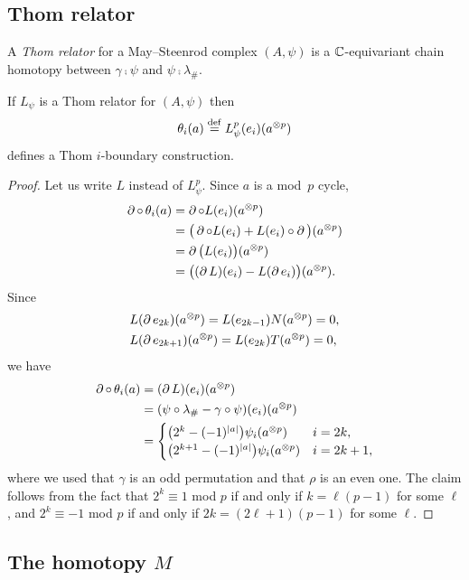 \subsection{Thom relator}

A \textit{Thom relator} for a May--Steenrod complex $(A, \psi)$ is a $\mathbb{C}$-equivariant chain homotopy between $\gamma \comp \psi$ and $\psi \comp \lambda_\#$.

\begin{theorem*}
	If $L_\psi$ is a Thom relator for $(A, \psi)$ then
	\[
	\theta_i(a) \stackrel{\mathrm{def}}{=} L_\psi^p(e_i)(a^{\otimes p})
	\]
	defines a Thom $i$-boundary construction.
\end{theorem*}

\begin{proof}
	Let us write $L$ instead of $L_\psi^p$.
	Since $a$ is a mod~$p$ cycle,
	\begin{align*}
		\operatorname{\partial} \mathbin{\circ}\, \theta_i(a) & =
		\operatorname{\partial} \mathbin{\circ} L(e_i)(a^{\otimes p}) \\ & =
		\big(\operatorname{\partial} \mathbin{\circ} L(e_i) + L(e_i) \mathbin{\circ} \operatorname{\partial} \big) (a^{\otimes p}) \\ & =
		\operatorname{\partial} \big(L(e_i)\big)(a^{\otimes p}) \\ & =
		\big((\operatorname{\partial} L)(e_i) - L(\operatorname{\partial} e_i)\big)(a^{\otimes p}).
	\end{align*}
	Since
	\begin{align*}
		&L(\operatorname{\partial} e_{2k})(a^{\otimes p}) = L(e_{2k-1}) N(a^{\otimes p}) = 0, \\
		&L(\operatorname{\partial} e_{2k+1})(a^{\otimes p}) = L(e_{2k}) T(a^{\otimes p}) = 0,
	\end{align*}
	we have
	\begin{align*}
		\operatorname{\partial} \mathbin{\circ}\, \theta_i(a) & =
		(\operatorname{\partial} L)(e_i)(a^{\otimes p}) \\ & =
		(\psi \mathbin{\circ} \lambda_\# - \gamma \mathbin{\circ} \psi)(e_i)(a^{\otimes p}) \\ & =
		\begin{cases}
			\big(2^k - (-1)^{\lvert a\rvert}\big) \psi_i(a^{\otimes p}) & i=2k, \\
			\big(2^{k+1} - (-1)^{\lvert a\rvert}\big) \psi_i(a^{\otimes p}) & i=2k+1,
		\end{cases}
	\end{align*}
	where we used that $\gamma$ is an odd permutation and that $\rho$ is an even one.
	The claim follows from the fact that $2^k \equiv 1$ mod $p$ if and only if $k = \ell(p-1)$ for some $\ell$, and $2^k \equiv -1$ mod $p$ if and only if $2k = (2\ell+1)(p-1)$ for some $\ell$.
\end{proof}

\subsection{The homotopy $M$}

